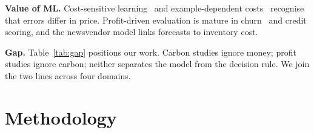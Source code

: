 \documentclass[conference]{IEEEtran}
\begin{document}
\textbf{Value of ML.} Cost-sensitive learning~\cite{elkan2001} and example-dependent costs~\cite{bahnsen2015} recognise
that errors differ in price. Profit-driven evaluation is mature in churn~\cite{verbeke2012,verbraken2013,hoppner2020}
and credit scoring, and the newsvendor model links forecasts to inventory cost.

\textbf{Gap.} Table~\ref{tab:gap} positions our work. Carbon studies ignore money; profit studies ignore carbon; neither
separates the model from the decision rule. We join the two lines across four domains.

\begin{table}[t]
\centering
\caption{Positioning against prior work.}
\label{tab:gap}
\scriptsize
\setlength{\tabcolsep}{1.5pt}
\end{table}

\section{Methodology}
\end{document}
